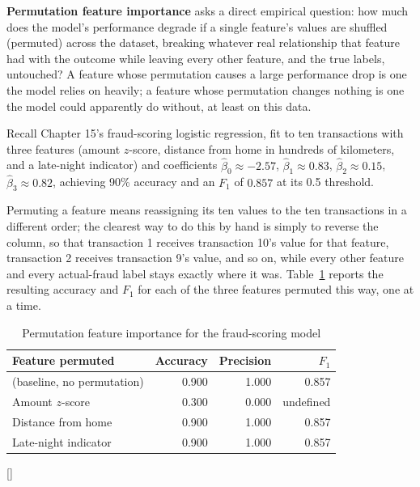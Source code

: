 \documentclass[../ai_in_finance]{subfiles}
\begin{document}
\textbf{Permutation feature importance} asks a direct empirical question: how much does the model's performance degrade if a single feature's values are shuffled (permuted) across the dataset, breaking whatever real relationship that feature had with the outcome while leaving every other feature, and the true labels, untouched? A feature whose permutation causes a large performance drop is one the model relies on heavily; a feature whose permutation changes nothing is one the model could apparently do without, at least on this data.

Recall Chapter 15's fraud-scoring logistic regression, fit to ten transactions with three features (amount $z$-score, distance from home in hundreds of kilometers, and a late-night indicator) and coefficients $\hat\beta_0 \approx -2.57$, $\hat\beta_1 \approx 0.83$, $\hat\beta_2 \approx 0.15$, $\hat\beta_3 \approx 0.82$, achieving 90\% accuracy and an $F_1$ of $0.857$ at its 0.5 threshold.

Permuting a feature means reassigning its ten values to the ten transactions in a different order; the clearest way to do this by hand is simply to reverse the column, so that transaction 1 receives transaction 10's value for that feature, transaction 2 receives transaction 9's value, and so on, while every other feature and every actual-fraud label stays exactly where it was. Table~\ref{tab:permutation_importance} reports the resulting accuracy and $F_1$ for each of the three features permuted this way, one at a time.

\begin{table}[htbp]
\centering
\begin{lrbox}{\bookmeasuredbox}
\begin{tabular}{lrrr}
\toprule
Feature permuted & Accuracy & Precision & $F_1$ \\
\midrule
(baseline, no permutation) & 0.900 & 1.000 & 0.857 \\
Amount $z$-score & 0.300 & 0.000 & undefined \\
Distance from home & 0.900 & 1.000 & 0.857 \\
Late-night indicator & 0.900 & 1.000 & 0.857 \\
\bottomrule
\end{tabular}
\end{lrbox}
\ifdim\wd\bookmeasuredbox<0.65\linewidth
\setlength{\bookcapwidth}{0.65\linewidth}
\else
\setlength{\bookcapwidth}{\wd\bookmeasuredbox}
\fi
{}[\bookcapwidth]{
\usebox{\bookmeasuredbox}
}{
\caption{Permutation feature importance for the fraud-scoring model}
\label{tab:permutation_importance}
}
\end{table}
\end{document}

